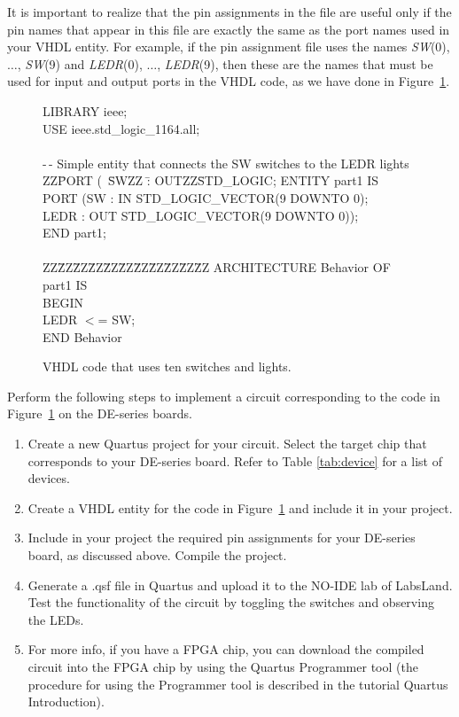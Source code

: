 \documentclass[epsfig,10pt,fullpage]{article}
\begin{document}
It is important to realize that the pin assignments in the
file are useful only if the pin names that appear in this file
are exactly the same as the port names used in your VHDL entity.
For example, if the pin assignment file uses the names {\it SW}(0), $\ldots$, {\it SW}(9) 
and {\it LEDR}(0), $\ldots$, {\it LEDR}(9), then these are the names that must be used
for input and output ports in the VHDL code, as we have done in Figure~\ref{fig:1}.

\begin{figure}[H]
\begin{center}
\begin{minipage}[t]{12.5 cm}
\begin{tabbing}
LIBRARY ieee;\\
USE ieee.std\_logic\_1164.all;\\
~\\
-\,- Simple entity that connects the SW switches to the LEDR lights\\
ZZ\=PORT (~\=SWZZ \=: OUTZZ\=STD\_LOGIC;\kill
ENTITY part1 IS \\
\>PORT (\>SW \>: IN \>STD\_LOGIC\_VECTOR(9 DOWNTO 0);\\
\>\>LEDR \>: OUT \>STD\_LOGIC\_VECTOR(9 DOWNTO 0));\\
END part1;\\
~\\
ZZ\=ZZ\=ZZ\=ZZ\=ZZ\=ZZ\=ZZ\=ZZ\=ZZ\=ZZ\=ZZ\kill
ARCHITECTURE Behavior OF part1 IS\\
BEGIN\\
\>LEDR $<$= SW;\\
END Behavior\\
\end{tabbing}
\end{minipage}
	\caption{VHDL code that uses ten switches and lights.}
	\label {fig:1}
\end{center}
\end{figure}

\newpage
Perform the following steps to implement a circuit corresponding to the code
in  Figure~\ref{fig:1} on the DE-series boards.
\begin{enumerate}
\item Create a new Quartus project for your circuit. Select the target chip that corresponds to your DE-series board.
Refer to Table \ref{tab:device} for a list of devices.
\item Create a VHDL entity for the code in  Figure~\ref{fig:1} and include it in your project.
\item Include in your project the required pin assignments for your DE-series board, as discussed
above. Compile the project.
\item Generate a .qsf file in Quartus and upload it to the NO-IDE lab of LabsLand. Test the functionality of the circuit by toggling the switches and observing the LEDs.
\item For more info, if you have a FPGA chip, you can download the compiled circuit into the FPGA chip by using the Quartus Programmer tool (the procedure for using the Programmer tool is described in the tutorial Quartus Introduction).
\end{enumerate}
\end{document}
